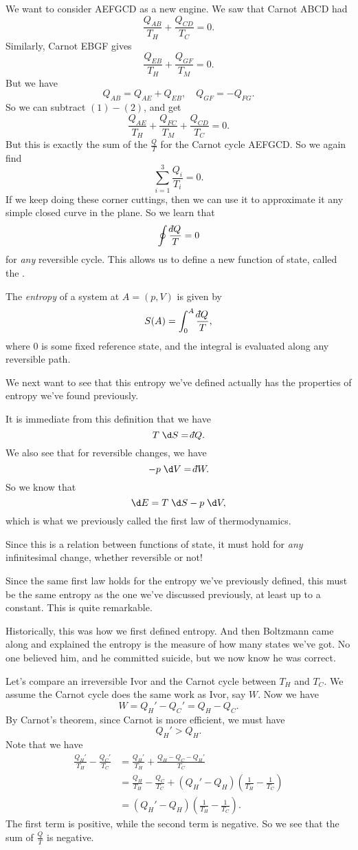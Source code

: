 \documentclass[a4paper]{article}
\def\di{{\mathchar'26\mkern-12mu d}}
\begin{document}
We want to consider AEFGCD as a new engine. We saw that Carnot ABCD had
\[
  \frac{Q_{AB}}{T_H} + \frac{Q_{CD}}{T_C} = 0.
\]
Similarly, Carnot EBGF gives
\[
  \frac{Q_{EB}}{T_H} + \frac{Q_{GF}}{T_M} = 0.
\]
But we have
\[
  Q_{AB} = Q_{AE} + Q_{EB},\quad Q_{GF} = - Q_{FG}.
\]
So we can subtract $(1) - (2)$, and get
\[
  \frac{Q_{AE}}{T_H} + \frac{Q_{FC}}{T_M} + \frac{Q_{CD}}{T_C} = 0.
\]
But this is exactly the sum of the $\frac{Q}{T}$ for the Carnot cycle AEFGCD. So we again find
\[
  \sum_{i = 1}^3 \frac{Q_i}{T_i} = 0.
\]
If we keep doing these corner cuttings, then we can use it to approximate it any simple closed curve in the plane. So we learn that
\[
  \oint \frac{\di Q}{T} = 0
\]
for \emph{any} reversible cycle. This allows us to define a new function of state, called the .
\begin{defi}[Entropy]
  The \emph{entropy} of a system at $A = (p, V)$ is given by
  \[
    S(A) =\int_0^A \frac{\di Q}{T},
  \]
  where $0$ is some fixed reference state, and the integral is evaluated along any reversible path.
\end{defi}
We next want to see that this entropy we've defined actually has the properties of entropy we've found previously.

It is immediate from this definition that we have
\[
  T\;\d S = \di Q.
\]
We also see that for reversible changes, we have
\[
  -p \;\d V = \di W.
\]
So we know that
\[
  \d E = T\;\d S - p \;\d V,
\]
which is what we previously called the first law of thermodynamics.

Since this is a relation between functions of state, it must hold for \emph{any} infinitesimal change, whether reversible or not!

Since the same first law holds for the entropy we've previously defined, this must be the same entropy as the one we've discussed previously, at least up to a constant. This is quite remarkable.

Historically, this was how we first defined entropy. And then Boltzmann came along and explained the entropy is the measure of how many states we've got. No one believed him, and he committed suicide, but we now know he was correct.

Let's compare an irreversible Ivor and the Carnot cycle between $T_H$ and $T_C$. We assume the Carnot cycle does the same work as Ivor, say $W$. Now we have
\[
  W = Q_H' - Q_C'= Q_H - Q_C.
\]
By Carnot's theorem, since Carnot is more efficient, we must have
\[
  Q_H' > Q_H.
\]
Note that we have
\begin{align*}
  \frac{Q_H'}{T_H} - \frac{Q_C'}{T_C} &= \frac{Q_H'}{T_H} + \frac{Q_H - Q_C - Q_H'}{T_C} \\
  &= \frac{Q_H}{T_H} - \frac{Q_C}{T_C} + (Q_H' - Q_H)\left(\frac{1}{T_H} - \frac{1}{T_C}\right) \\
  &= (Q_H' - Q_H)\left(\frac{1}{T_H} - \frac{1}{T_C}\right).
\end{align*}
The first term is positive, while the second term is negative. So we see that the sum of $\frac{Q}{T}$ is negative.
\end{document}
